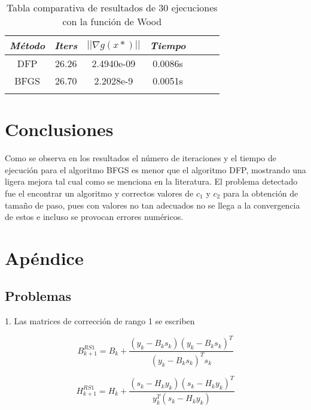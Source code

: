 \documentclass[conference]{IEEEtran}
\begin{document}
\begin{table}[htbp]
    \caption{Tabla comparativa de resultados de 30 ejecuciones con la función de Wood}
    \begin{center}
        \begin{tabular}{|c|c|c|c|c|c|c|}
            \hline
			\textbf{\textit{Método}}& \textbf{\textit{Iters}}& \textbf{\textit{$||\nabla g(x*)||$}}& \textbf{\textit{Tiempo}} \\
            \hline
            DFP  & 26.26 & 2.4940e-09 & 0.0086s \\
            BFGS & 26.70 & 2.2028e-9 & 0.0051s \\
            \hline
            \multicolumn{4}{l}{}
        \end{tabular}
        \label{tab2}
    \end{center}
\end{table}


\section{Conclusiones}

Como se observa en los resultados el número de iteraciones y el tiempo de ejecución para el
algoritmo BFGS es menor que el algoritmo DFP, mostrando una ligera mejora tal cual como se menciona
en la literatura. El problema detectado fue el encontrar un algoritmo y correctos valores de $c_1$ y
$c_2$ para la obtención de tamaño de paso, pues con valores no tan adecuados no se llega a la
convergencia de estos e incluso se provocan errores numéricos.


\newpage

\section{Apéndice}

\subsection*{Problemas}

1. Las matrices de corrección de rango 1 se escriben

\begin{equation}
    B_{k+1}^{RS1} = B_k + \frac{(y_k - B_k s_k)(y_k - B_k s_k)^T}{(y_k - B_k s_k)^T s_k}
\end{equation}

\begin{equation}
    H_{k+1}^{RS1} = H_k + \frac{(s_k - H_k y_k)(s_k - H_k y_k)^T}{y_k^T(s_k - H_k y_k)}
\end{equation}
\end{document}
